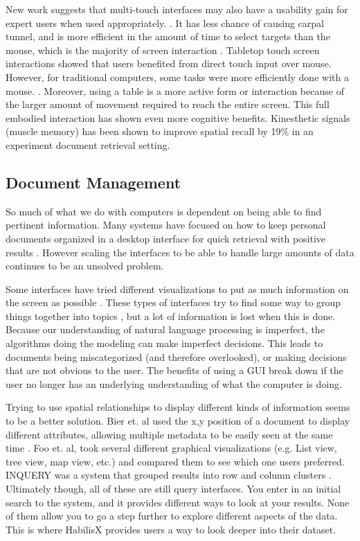 \documentclass{article}
\begin{document}
	New work suggests that multi-touch interfaces may also have a usability gain for expert users when used appropriately. \cite{Forlines2007} \cite{Tan2002}\cite{North2009}.  It has less chance of causing carpal tunnel, and is more efficient in the amount of time to select targets than the mouse, which is the majority of screen interaction \cite{Forlines2007}.  Tabletop touch screen interactions showed that users benefited from direct touch input over mouse.  However, for traditional computers, some tasks were more efficiently done with a mouse. \cite{Kristensson2008}.  Moreover, using a table is a more active form or interaction because of the larger amount of movement required to reach the entire screen. This  full embodied interaction has shown  even more cognitive benefits. Kinesthetic signals (muscle memory) has been shown to improve spatial recall by 19\% in an experiment document retrieval setting.\cite{Tan2002} 


\subsection{Document Management}

So much of what we do with computers is dependent on being able to find pertinent information.  Many systems have focused on how to keep personal documents organized in a desktop interface for quick retrieval with positive results \cite{Agarawala2006} \cite{Foo2007:ECDL} \cite{Foo2007:ICADL}. However scaling the interfaces to be able to handle large amounts of data continues to be an unsolved problem. \cite{Whittaker2001} 

Some interfaces have tried different visualizations to put as much information on the screen as possible \cite{Newman2010} \cite{Nowell1996} \cite{Shneiderman2000} \cite{Yost2006}.  These types of interfaces try to find some way to group things together into topics \cite{Newman2010}, but a lot of information is lost when this is done.\cite{Nowell1996}  Because our understanding of natural language processing is imperfect, the algorithms doing the modeling can make imperfect decisions.  This leads to documents being miscategorized (and therefore overlooked), or making decisions that are not obvious to the user.  The benefits of using a GUI break down if the user no longer has an underlying understanding of what the computer is doing.  

Trying to use spatial relationships to display different kinds of information seems to be a better solution.   Bier et. al used the x,y position of a document to display different attributes, allowing multiple metadata to be easily seen at the same time \cite{Bier2005}.  Foo et. al, took several different graphical visualizations (e.g. List view, tree view, map view, etc.) and compared them to see which one users preferred. \cite{Foo2007:ECDL}  INQUERY was a system that grouped results into row and column clusters \cite{Mothe1998}.  Ultimately though, all of these are still query interfaces.  You enter in an initial search to the system, and it provides different ways to look at your results.  None of them allow you to go a step further to explore different aspects of the data.  This is where HabilisX provides users a way to look deeper into their dataset.  
 
\end{document}
